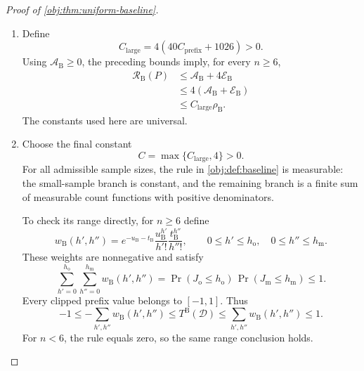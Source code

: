 \begin{proof}[Proof of \cref{obj:thm:uniform-baseline}]
\begin{enumerate}
For the overflow allowance, both pool sizes are at least \(n/3\), giving
\[
\mathcal E_{\mathrm B}\le2e^{-n/3}.
\]
The elementary bound \(x e^{-x}\le e^{-1}\), obtained by maximizing \(x e^{-x}\), together with \(\epsilon\le1/4\), yields
\[
(n\epsilon)\,2e^{-n/3}
\le
\frac n2e^{-n/3}
=
\frac32\left(\frac n3e^{-n/3}\right)
\le
\frac32e^{-1}
\le2.
\]
Since \(n\epsilon>0\), this proves
\[
\mathcal E_{\mathrm B}\le\frac{2}{n\epsilon}.
\]
Combining these estimates gives
\[
\begin{aligned}
\mathcal A_{\mathrm B}+\mathcal E_{\mathrm B}
&\le
\frac{40C_{\mathrm{prefix}}+2}{n\epsilon}
+
1024\left(\frac{d}{(n+m)\epsilon}\right)^2\\
&\le
(40C_{\mathrm{prefix}}+1026)\rho_{\mathrm B}.
\end{aligned}
\]

\item
Define
\[
C_{\mathrm{large}}
=
4(40C_{\mathrm{prefix}}+1026)>0.
\]
Using \(\mathcal A_{\mathrm B}\ge0\), the preceding bounds imply, for every \(n\ge6\),
\[
\begin{aligned}
\mathcal R_{\mathrm B}(P)
&\le
\mathcal A_{\mathrm B}+4\mathcal E_{\mathrm B}\\
&\le
4(\mathcal A_{\mathrm B}+\mathcal E_{\mathrm B})\\
&\le
C_{\mathrm{large}}\rho_{\mathrm B}.
\end{aligned}
\]
The constants used here are universal.

\item
Choose the final constant
\[
C=\max\{C_{\mathrm{large}},4\}>0.
\]
For all admissible sample sizes, the rule in \cref{obj:def:baseline} is measurable: the small-sample branch is constant, and the remaining branch is a finite sum of measurable count functions with positive denominators.

To check its range directly, for \(n\ge6\) define
\[
w_{\mathrm B}(h',h'')
=
e^{-u_{\mathrm B}-t_{\mathrm B}}
\frac{u_{\mathrm B}^{h'}}{h'!}
\frac{t_{\mathrm B}^{h''}}{h''!},
\qquad
0\le h'\le h_{\mathrm o},\quad
0\le h''\le h_{\mathrm m}.
\]
These weights are nonnegative and satisfy
\[
\sum_{h'=0}^{h_{\mathrm o}}
\sum_{h''=0}^{h_{\mathrm m}}
w_{\mathrm B}(h',h'')
=
\Pr(J_{\mathrm o}\le h_{\mathrm o})\,
\Pr(J_{\mathrm m}\le h_{\mathrm m})
\le1.
\]
Every clipped prefix value belongs to \([-1,1]\). Thus
\[
-1
\le
-\sum_{h',h''}w_{\mathrm B}(h',h'')
\le
T^{\mathrm B}(\mathcal D)
\le
\sum_{h',h''}w_{\mathrm B}(h',h'')
\le1.
\]
For \(n<6\), the rule equals zero, so the same range conclusion holds.


\end{enumerate}
\end{proof}
